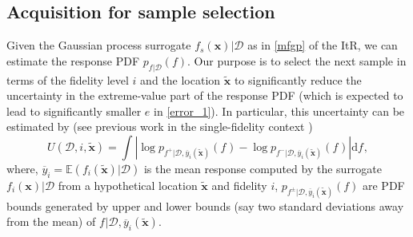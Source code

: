 \documentclass[11pt]{article}
\begin{document}
\subsection{Acquisition for sample selection}
Given the Gaussian process surrogate $f_{s}(\mathbf{x})|\mathcal{D}$ as in \eqref{mfgp} of the ItR, we can estimate the response PDF $p_{f|\mathcal{D}}(f)$. Our purpose is to select the next sample in terms of the fidelity level $i$ and the location $\tilde{\mathbf{x}}$ to significantly reduce the uncertainty in the extreme-value part of the response PDF (which is expected to lead to significantly smaller $e$ in \eqref{error_1}). In particular, this uncertainty can be estimated by (see previous work in the single-fidelity context \cite[][]{mohamad2018sequential})
\begin{equation}
    U(\mathcal{D}, i, \tilde{\mathbf{x}}) = \int |\log p_{f^{+}|\mathcal{D}, \overline{y}_i(\tilde{\mathbf{x}})}(f_{}) - \log p_{f^{-}|\mathcal{D}, \overline{y}_i(\tilde{\mathbf{x}})}(f_{})| \mathrm{d} f_{},
\label{acq_L}
\end{equation}
where, $\overline{y}_i = \mathbb{E}(f_i(\tilde{\mathbf{x}})|\mathcal{D})$ is the mean response computed by the surrogate $f_{i}(\mathbf{x})|\mathcal{D}$ from a hypothetical location $\tilde{\mathbf{x}}$ and fidelity $i$, $p_{f^{\pm}|\mathcal{D}, \overline{y}_i(\tilde{\mathbf{x}})}(f)$ are PDF bounds generated by upper and lower bounds (say two standard deviations away from the mean) of $f_{}|\mathcal{D}, \overline{y}_i(\tilde{\mathbf{x}})$.  
\end{document}

